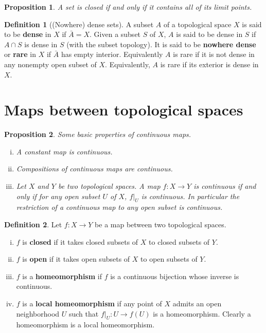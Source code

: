 \documentclass[a4paper,12pt,parskip=half*,chapterprefix=true,numbers=noendperiod]{scrreprt}
\newtheorem{proposition}{Proposition}[section]
\theoremstyle{definition}
\newtheorem{definition}{Definition}[section]
\theoremstyle{remark}
\begin{document}
\begin{proposition}
A set is closed if and only if it contains all of its limit points.
\end{proposition}

\begin{definition}[(Nowhere) dense sets]
A subset $A$ of a topological space $X$ is said to be \textbf{dense} in $X$ if $\bar{A}=X$. Given a subset $S$ of $X$, $A$ is said to be dense in $S$ if $A\cap S$ is dense in $S$ (with the subset topology). It is said to be \textbf{nowhere dense} or \textbf{rare} in $X$ if $\bar{A}$ has empty interior. Equivalently $A$ is rare if it is not dense in any nonempty open subset of $X$. Equivalently, $A$ is rare if its exterior is dense in $X$. 
\end{definition}

\section{Maps between topological spaces}

\begin{proposition}
	Some basic properties of continuous maps.
	\begin{enumerate}[(i)]
		\item A constant map is continuous.
		\item Compositions of continuous maps are continuous.
		\item Let $X$ and $Y$ be two topological spaces. A map $f:X\to Y$ is continuous if and only if for any open subset $U$ of $X$, $f|_U$ is continuous. In particular the restriction of a continuous map to any open subset is continuous.
	\end{enumerate}
\end{proposition}

\begin{definition}
	Let $f:X\to Y$ be a map between two topological spaces.
	\begin{enumerate}[(i)]
		\item $f$ is \textbf{closed} if it takes closed subsets of $X$ to closed subsets of $Y$.
		\item $f$ is \textbf{open} if it takes open subsets of $X$ to open subsets of $Y$.
		\item $f$ is a \textbf{homeomorphism} if $f$ is a continuous bijection whose inverse is continuous.
		\item $f$ is a \textbf{local homeomorphism} if any point of $X$ admits an open neighborhood $U$ such that $f|_U:U\to f(U)$ is a homeomorphism. Clearly a homeomorphism is a local homeomorphism.
	\end{enumerate}
\end{definition}
\end{document}

